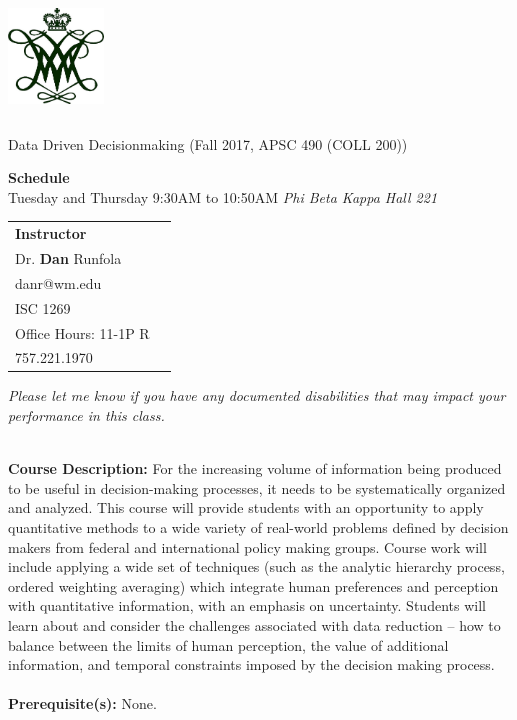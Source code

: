 \documentclass[11pt]{article}
\begin{document}
  \begin{center}

{\includegraphics[height=1.25in,width=1in]{wmchiffre1.jpg}} 

\LARGE Data Driven Decisionmaking (Fall 2017, APSC 490 (COLL 200))\\ \vspace{3mm}
\end{center}
\large \textbf{Schedule} \\
\normalsize Tuesday and Thursday 9:30AM to 10:50AM \textit{Phi Beta Kappa Hall 221} \\
\vspace{2mm}

\begin{table}[ht]
\begin{tabular}{l l}
\large \textbf{Instructor} & \\
\large Dr. \textbf{Dan} Runfola \\
\large danr@wm.edu   \\
\large ISC 1269 \\
\large Office Hours: 11-1P R \\
\large 757.221.1970  \\
\end{tabular}
\end{table}


\textit{Please let me know if you have any documented disabilities that may impact your performance in this class.}

\textbf {\large \\ Course Description:} For the increasing volume of information being produced to be useful in decision-making processes, it needs to be systematically organized and analyzed. This course will provide students with an opportunity to apply quantitative methods to a wide variety of real-world problems defined by decision makers from federal and international policy making groups. Course work will include applying a wide set of techniques (such as the analytic hierarchy process, ordered weighting averaging) which integrate human preferences and perception with quantitative information, with an emphasis on uncertainty. Students will learn about and consider the challenges associated with data reduction – how to balance between the limits of human perception, the value of additional information, and temporal constraints imposed by the decision making process.  \\
\\
\textbf {Prerequisite(s):} None.
\end{document}
